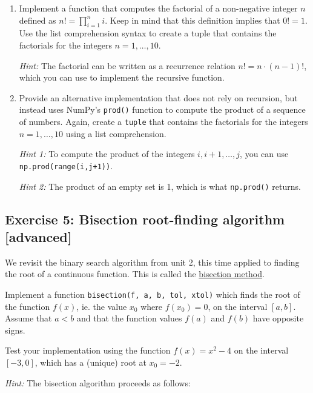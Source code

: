 \documentclass[10pt]{scrartcl}
\begin{document}
\begin{enumerate}
\def\labelenumi{\arabic{enumi}.}
\item
  Implement a function that computes the factorial of a non-negative
  integer \(n\) defined as \(n! = \prod_{i=1}^n i\). Keep in mind that
  this definition implies that \(0! = 1\). Use the list comprehension
  syntax to create a tuple that contains the factorials for the integers
  \(n=1,\dots,10\).

  \emph{Hint:} The factorial can be written as a recurrence relation
  \(n! = n \cdot (n-1)!\), which you can use to implement the recursive
  function.
\item
  Provide an alternative implementation that does not rely on recursion,
  but instead uses NumPy's \texttt{prod()} function to compute the
  product of a sequence of numbers. Again, create a \texttt{tuple} that
  contains the factorials for the integers \(n=1,\dots,10\) using a list
  comprehension.

  \emph{Hint 1:} To compute the product of the integers
  \(i,i+1,\dots,j\), you can use \texttt{np.prod(range(i,j+1))}.

  \emph{Hint 2:} The product of an empty set is 1, which is what
  \texttt{np.prod()} returns.
\end{enumerate}

\hypertarget{exercise-5-bisection-root-finding-algorithm-advanced}{%
\subsection{Exercise 5: Bisection root-finding algorithm
{[}advanced{]}}\label{exercise-5-bisection-root-finding-algorithm-advanced}}

We revisit the binary search algorithm from unit 2, this time applied to
finding the root of a continuous function. This is called the
\href{https://en.wikipedia.org/wiki/Bisection_method}{bisection method}.

Implement a function \texttt{bisection(f,\ a,\ b,\ tol,\ xtol)} which
finds the root of the function \(f(x)\), ie. the value \(x_0\) where
\(f(x_0) = 0\), on the interval \([a,b]\). Assume that \(a<b\) and that
the function values \(f(a)\) and \(f(b)\) have opposite signs.

Test your implementation using the function \(f(x) = x^2 - 4\) on the
interval \([-3,0]\), which has a (unique) root at \(x_0 = -2\).

\emph{Hint:} The bisection algorithm proceeds as follows:
\end{document}
